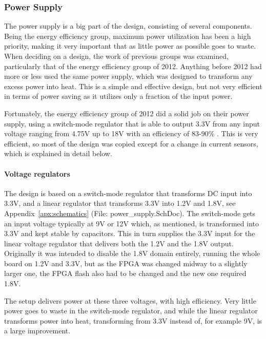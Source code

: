 
\subsubsection{Power Supply}

The power supply is a big part of the design, consisting of several components.
Being the energy efficiency group, maximum power utilization has been a high
priority, making it very important that as little power as possible goes to
waste. When deciding on a design, the work of previous groups was examined,
particularly that of the energy efficiency group of 2012. Anything before 2012
had more or less used the same power supply, which was designed to transform any
excess power into heat. This is a simple and effective design, but not very
efficient in terms of power saving as it utilizes only a fraction of the input
power.

Fortunately, the energy efficiency group of 2012 did a solid job on their power
supply, using a switch-mode regulator that is able to output 3.3V from any input
voltage ranging from 4.75V up to 18V with an efficiency of 83-90\% . This is very efficient, so most of the design
was copied except for a change in current sensors, which is explained in detail
below.

\paragraph{Voltage regulators}

The design is based on a switch-mode regulator that transforms DC input into
3.3V, and a linear regulator
that transforms 3.3V into 1.2V and 1.8V, see Appendix~\ref{apx:schematics}
(File: power\_supply.SchDoc). The switch-mode gets an input voltage typically at
9V or 12V which, as mentioned, is transformed into 3.3V and kept stable by
capacitors. This in turn supplies the 3.3V input for the linear voltage
regulator that delivers both the 1.2V and the 1.8V output. Originally it was
intended to disable the 1.8V domain entirely, running the whole board on 1.2V
and 3.3V, but as the FPGA was changed midway to a slightly larger one, the FPGA
flash also had to be changed and the new one required 1.8V.

The setup delivers power at these three voltages, with high efficiency. Very
little power goes to waste in the switch-mode regulator, and while the linear
regulator transforms power into heat, transforming from 3.3V instead of, for
example 9V, is a large improvement.

